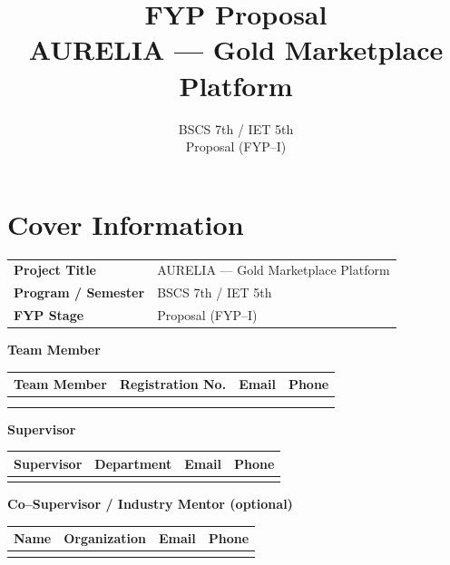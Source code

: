 \documentclass[11pt,a4paper]{article}
\title{\textbf{FYP Proposal}\\[0.4em]
\large AURELIA --- Gold Marketplace Platform}
\author{BSCS 7th / IET 5th\\Proposal (FYP--I)}
\date{}
\begin{document}
\maketitle
\thispagestyle{fancy}

\section*{Cover Information}

\begin{tabularx}{\textwidth}{@{}>{\bfseries}lX@{}}
Project Title & AURELIA --- Gold Marketplace Platform \\
Program / Semester & BSCS 7th / IET 5th \\
FYP Stage & Proposal (FYP--I) \\
\end{tabularx}

\vspace{0.8em}
\noindent\textbf{Team Member}

\begin{tabularx}{\textwidth}{@{}*{4}{X}@{}}
\toprule
\textbf{Team Member} & \textbf{Registration No.} & \textbf{Email} & \textbf{Phone} \\
\midrule
 &  &  &  \\
 &  &  &  \\
\bottomrule
\end{tabularx}

\vspace{0.8em}
\noindent\textbf{Supervisor}

\begin{tabularx}{\textwidth}{@{}*{4}{X}@{}}
\toprule
\textbf{Supervisor} & \textbf{Department} & \textbf{Email} & \textbf{Phone} \\
\midrule
 &  &  &  \\
\bottomrule
\end{tabularx}

\vspace{0.8em}
\noindent\textbf{Co--Supervisor / Industry Mentor (optional)}

\begin{tabularx}{\textwidth}{@{}*{4}{X}@{}}
\toprule
\textbf{Name} & \textbf{Organization} & \textbf{Email} & \textbf{Phone} \\
\midrule
 &  &  &  \\
\bottomrule
\end{tabularx}

\end{document}
